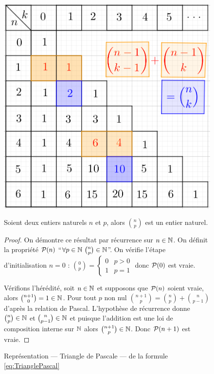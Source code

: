 \begin{figure}
    \centering
    \includegraphics[scale=0.7]{./Triangle-de-Pascal-01-3.png}
    \caption{Représentation --- Triangle de Pascale --- de la formule \eqref{eq:TrianglePascal}}
    \label{fig:TrianglePascal}
\begin{prop}
  Soient deux entiers naturels \(n\) et \(p\), alors \(\binom{n}{p}\) est un entier naturel.
\end{prop}
\begin{proof}
  On démontre ce résultat par récurrence sur \(n\in\N\). On définit la propriété \(\P(n)\) ``\(\forall p \in \N \ \binom{n}{p}\in\N\)''. On vérifie l'étape d'initialisation \(n=0\) : \(\binom{0}{p}=\begin{cases} 0 & p>0 \\ 1 & p=1\end{cases}\) donc \(\P(0)\) est vraie. 
  
Vérifions l'hérédité, soit \(n \in \N\) et supposons que \(\P(n)\) soient vraie, alors \(\binom{n+1}{0}=1\in \N\). Pour tout \(p\) non nul \(\binom{n+1}{p}=\binom{n}{p}+\binom{n}{p-1}\) d'après la relation de Pascal. L'hypothèse de récurrence donne \(\binom{n}{p}\in\N\) et \(\binom{n}{p-1}\in\N\) et puisque l'addition est une loi de composition interne sur \(\N\) alors \(\binom{n+1}{p}\in\N\). Donc \(\P(n+1)\) est vraie. 


\end{proof}
\end{figure}
